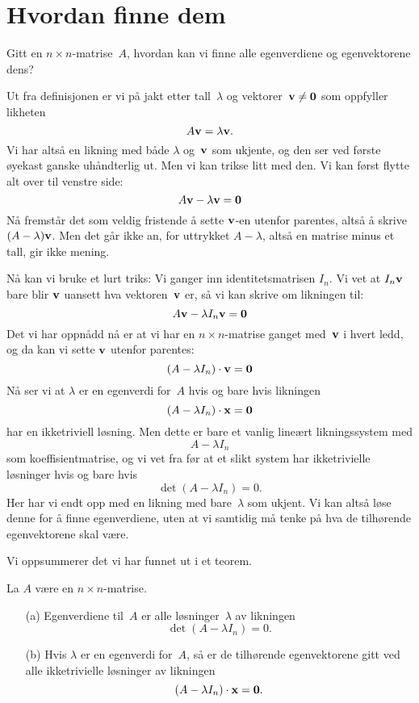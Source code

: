 


\section*{Hvordan finne dem}

Gitt en $n \times n$-matrise~$A$, hvordan kan vi finne alle
egenverdiene og egenvektorene dens?

Ut fra definisjonen er vi på jakt etter tall~$\lambda$ og
vektorer~$\mathbf{v} \ne \mathbf{0}$ som oppfyller likheten
\[
A \mathbf{v} = \lambda \mathbf{v}.
\]
Vi har altså en likning med både $\lambda$ og~$\mathbf{v}$ som ukjente, og
den ser ved første øyekast ganske uhåndterlig ut.  Men vi kan trikse
litt med den.  Vi kan først flytte alt over til venstre side:
\[
A \mathbf{v} - \lambda \mathbf{v} = \mathbf{0}
\]
Nå fremstår det som veldig fristende å sette $\mathbf{v}$-en utenfor
parentes, altså å skrive $(A - \lambda) \mathbf{v}$.  Men det går ikke an,
for uttrykket $A - \lambda$, altså en matrise minus et tall, gir ikke
mening.

Nå kan vi bruke et lurt triks: Vi ganger inn identitetsmatrisen $I_n$.
Vi vet at $I_n \mathbf{v}$ bare blir $\mathbf{v}$ uansett hva vektoren~$\mathbf{v}$
er, så vi kan skrive om likningen til:
\[
A \mathbf{v} - \lambda I_n \mathbf{v} = \mathbf{0}
\]
Det vi har oppnådd nå er at vi har en $n \times n$-matrise ganget
med~$\mathbf{v}$ i hvert ledd, og da kan vi sette $\mathbf{v}$ utenfor parentes:
\[
(A - \lambda I_n) \cdot \mathbf{v} = \mathbf{0}
\]
Nå ser vi at $\lambda$ er en egenverdi for~$A$ hvis og bare hvis
likningen
\[
(A - \lambda I_n) \cdot \mathbf{x} = \mathbf{0}
\]
har en ikketriviell løsning.  Men dette er bare et vanlig lineært
likningssystem med
\[
A - \lambda I_n
\]
som koeffisientmatrise, og vi vet fra før %
at et slikt system har ikketrivielle løsninger hvis og bare hvis
\[
\det (A - \lambda I_n) = 0.
\]
Her har vi endt opp med en likning med bare~$\lambda$ som ukjent.  Vi
kan altså løse denne for å finne egenverdiene, uten at vi samtidig må
tenke på hva de tilhørende egenvektorene skal være.

Vi oppsummerer det vi har funnet ut i et teorem.

\begin{thm}
\label{thm:finne-egenverdier}
La $A$ være en $n \times n$-matrise.
\begin{enumerate}
\item[(a)] Egenverdiene til~$A$ er alle løsninger~$\lambda$ av
likningen
\[
\det (A - \lambda I_n) = 0.
\]
\item[(b)] Hvis $\lambda$ er en egenverdi for~$A$, så er de tilhørende
egenvektorene gitt ved alle ikketrivielle løsninger av likningen
\[
(A - \lambda I_n) \cdot \mathbf{x} = \mathbf{0}.
\]
\end{enumerate}
\end{thm}

